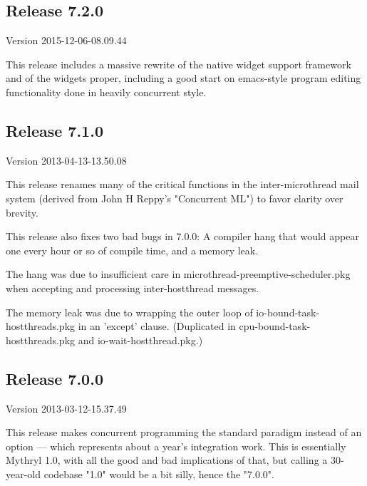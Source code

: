 
\subsection{Release 7.2.0}
\label{section:src:release-7.2.0}

Version 2015-12-06-08.09.44

This release includes a massive rewrite of the native widget support framework 
and of the widgets proper, including a good start on emacs-style program editing 
functionality done in heavily concurrent style.


\cutend*

\subsection{Release 7.1.0}
\label{section:src:release-7.1.0}

Version 2013-04-13-13.50.08

This release renames many of the critical functions in the inter-microthread 
mail system (derived from John H Reppy's "Concurrent ML") to favor clarity over 
brevity.

This release also fixes two bad bugs in 7.0.0:  A compiler hang that would appear 
one every hour or so of compile time, and a memory leak.

The hang was due to 
insufficient care in microthread-preemptive-scheduler.pkg when accepting and 
processing inter-hostthread messages.

The memory leak was due to wrapping the 
outer loop of io-bound-task-hostthreads.pkg in an 'except' clause. (Duplicated 
in cpu-bound-task-hostthreads.pkg and io-wait-hostthread.pkg.)


\cutend*

\subsection{Release 7.0.0}
\label{section:src:release-7.0.0}

Version 2013-03-12-15.37.49

This release makes concurrent programming the standard paradigm instead 
of an option --- which represents about a year's integration work.  This is essentially 
Mythryl 1.0, with all the good and bad implications of that, but calling a 30-year-old 
codebase "1.0" would be a bit silly, hence the "7.0.0".

